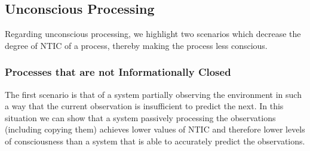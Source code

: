 \documentclass[utf8]{article}
\begin{document}
        \subsection{Unconscious Processing}
            Regarding unconscious processing, we highlight two scenarios which decrease the degree of NTIC of a process, thereby making the process less conscious.
        
            \subsubsection*{Processes that are not Informationally Closed}\label{sec:reflexive}
            
            
            The first scenario is that of a system partially observing the environment in such a way that the current observation is insufficient to predict the next. In this situation we can show that a system passively processing the observations (including copying them) achieves lower values of NTIC and therefore lower levels of consciousness than a system that is able to accurately predict the observations. 
            
\end{document}
